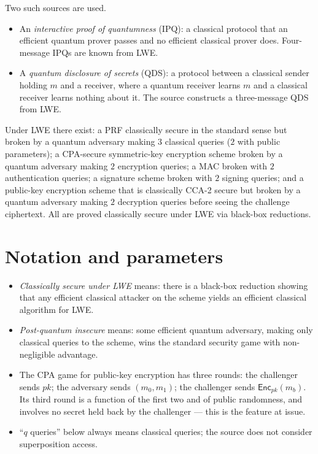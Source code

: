 \documentclass{aicr-conjecture}
\newcommand{\Enc}{\mathsf{Enc}}
\begin{document}
Two such sources are used.

\begin{itemize}[nosep]
  \item An \emph{interactive proof of quantumness} (IPQ): a classical
    protocol that an efficient quantum prover passes and no efficient
    classical prover does. Four-message IPQs are known from LWE\@.
  \item A \emph{quantum disclosure of secrets} (QDS): a protocol between
    a classical sender holding $m$ and a receiver, where a quantum
    receiver learns $m$ and a classical receiver learns nothing about
    it. The source constructs a three-message QDS from LWE\@.
\end{itemize}

\begin{theorem}\label{thm:known}
Under LWE there exist: a PRF classically secure in the standard sense but
broken by a quantum adversary making $3$ classical queries ($2$ with
public parameters); a CPA-secure symmetric-key encryption scheme broken
by a quantum adversary making $2$ encryption queries; a MAC broken with
$2$ authentication queries; a signature scheme broken with $2$ signing
queries; and a public-key encryption scheme that is classically CCA-2
secure but broken by a quantum adversary making $2$ decryption queries
before seeing the challenge ciphertext. All are proved classically secure
under LWE via black-box reductions.
\end{theorem}

\section{Notation and parameters}\label{sec:notation}

\begin{itemize}[nosep]
  \item \emph{Classically secure under LWE} means: there is a black-box
    reduction showing that any efficient classical attacker on the scheme
    yields an efficient classical algorithm for LWE\@.
  \item \emph{Post-quantum insecure} means: some efficient quantum
    adversary, making only classical queries to the scheme, wins the
    standard security game with non-negligible advantage.
  \item The CPA game for public-key encryption has three rounds: the
    challenger sends $pk$; the adversary sends $(m_0, m_1)$; the
    challenger sends $\Enc_{pk}(m_b)$. Its third round is a function of
    the first two and of public randomness, and involves no secret held
    back by the challenger --- this is the feature at issue.
  \item ``$q$ queries'' below always means classical queries; the source
    does not consider superposition access.
\end{itemize}
\end{document}
